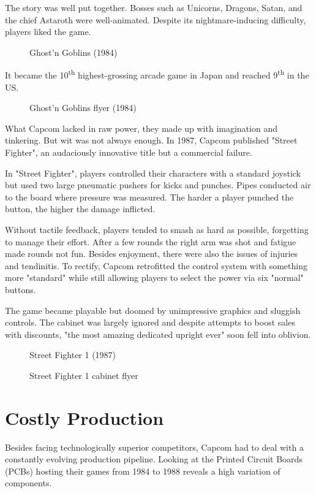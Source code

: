 The story was well put together. Bosses such as Unicorns, Dragons, Satan, and the chief Astaroth were well-animated. Despite its nightmare-inducing difficulty, players liked the game.

\vfill 

\begin{figure}[H]
\caption*{Ghost’n Goblins (1984)}
\end{figure}
\pagebreak

It became the 10\textsuperscript{th} highest-grossing arcade game in Japan and reached 9\textsuperscript{th} in the US.
\vfill 
\begin{figure}[H]
\caption*{Ghost’n Goblins flyer (1984)}
\end{figure}
\pagebreak

What Capcom lacked in raw power, they made up with imagination and tinkering. But wit was not always enough. In 1987, Capcom published "Street Fighter", an audaciously innovative title but a commercial failure.

In "Street Fighter", players controlled their characters with a standard joystick but used two large pneumatic pushers for kicks and punches. Pipes conducted air to the board where pressure was measured. The harder a player punched the button, the higher the damage inflicted.

Without tactile feedback, players tended to smash as hard as possible, forgetting to manage their effort. After a few rounds the right arm was shot and fatigue made rounds not fun. Besides enjoyment, there were also the issues of injuries and tendinitis. To rectify, Capcom retrofitted the control system with something more "standard" while still allowing players to select the power via six "normal" buttons. 

The game became playable but doomed by unimpressive graphics and sluggish controls. The cabinet was largely ignored and despite attempts to boost sales with discounts, "the most amazing dedicated upright ever" soon fell into oblivion.


\begin{figure}[H]
\caption*{Street Fighter 1 (1987)}
\end{figure}


\begin{figure}[H]
\caption*{Street Fighter 1 cabinet flyer}
\end{figure}


\section{Costly Production}
Besides facing technologically superior competitors, Capcom had to deal with a constantly evolving production pipeline. Looking at the Printed Circuit Boards (PCBs) hosting their games from 1984 to 1988 reveals a high variation of components.

